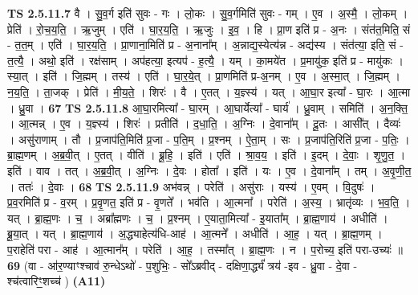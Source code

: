 \documentclass[17pt]{extarticle}
\begin{document}
                  \newline
                                \textbf{ TS 2.5.11.7} \newline
                  वै । सु॒व॒र्ग इति॑ सुवः - गः । लो॒कः । सु॒व॒र्गमिति॑ सुवः - गम् । ए॒व । अ॒स्मै॒ । लो॒कम् । प्रेति॑ । रो॒च॒य॒ति॒ । ऋ॒जुम् । एति॑ । घा॒र॒य॒ति॒ । ऋ॒जुः । इ॒व॒ । हि । प्रा॒ण इति॑ प्र - अ॒नः । संत॑त॒मिति॒ सं - त॒त॒म् । एति॑ । घा॒र॒य॒ति॒ । प्रा॒णाना॒मिति॑ प्र - अ॒नाना᳚म् । अ॒न्नाद्य॒स्येत्य॑न्न - अद्य॑स्य । संत॑त्या॒ इति॒ सं - त॒त्यै॒ । अथो॒ इति॑ । रक्ष॑साम् । अप॑हत्या॒ इत्यप॑ - ह॒त्यै॒ । यम् । का॒मये॑त । प्र॒मायु॑क॒ इति॑ प्र - मायु॑कः । स्या॒त् । इति॑ । जि॒ह्मम् । तस्य॑ । एति॑ । घा॒र॒ये॒त् । प्रा॒णमिति॑ प्र-अ॒नम् । ए॒व । अ॒स्मा॒त् । जि॒ह्मम् । न॒य॒ति॒ । ता॒जक् । प्रेति॑ । मी॒य॒ते॒ । शिरः॑ । वै । ए॒तत् । य॒ज्ञ्स्य॑ । यत् । आ॒घा॒र इत्या᳚ - घा॒रः । आ॒त्मा । ध्रु॒वा । \textbf{  67} \newline
                  \newline
                                \textbf{ TS 2.5.11.8} \newline
                  आ॒घा॒रमित्या᳚ - घा॒रम् । आ॒घार्येत्या᳚ - घार्य॑ । ध्रु॒वाम् । समिति॑ । अ॒न॒क्ति॒ । आ॒त्मन्न् । ए॒व । य॒ज्ञ्स्य॑ । शिरः॑ । प्रतीति॑ । द॒धा॒ति॒ । अ॒ग्निः । दे॒वाना᳚म् । दू॒तः । आसी᳚त् । दैव्यः॑ । असु॑राणाम् । तौ । प्र॒जाप॑ति॒मिति॑ प्र॒जा - प॒ति॒म् । प्र॒श्नम् । ऐ॒ता॒म् । सः । प्र॒जाप॑ति॒रिति॑ प्र॒जा - प॒तिः॒ । ब्रा॒ह्म॒णम् । अ॒ब्र॒वी॒त् । ए॒तत् । वीति॑ । ब्रू॒हि॒ । इति॑ । एति॑ । श्रा॒व॒य॒ । इति॑ । इ॒दम् । दे॒वाः॒ । शृ॒णु॒त॒ । इति॑ । वाव । तत् । अ॒ब्र॒वी॒त् । अ॒ग्निः । दे॒वः । होता᳚ । इति॑ । यः । ए॒व । दे॒वाना᳚म् । तम् । अ॒वृ॒णी॒त॒ । ततः॑ । दे॒वाः । \textbf{  68} \newline
                  \newline
                                \textbf{ TS 2.5.11.9} \newline
                  अभ॑वन्न् । परेति॑ । असु॑राः । यस्य॑ । ए॒वम् । वि॒दुषः॑ । प्र॒व॒रमिति॑ प्र - व॒रम् । प्र॒वृ॒णत॒ इति॑ प्र - वृ॒णते᳚ । भव॑ति । आ॒त्मना᳚ । परेति॑ । अ॒स्य॒ । भ्रातृ॑व्यः । भ॒व॒ति॒ । यत् । ब्रा॒ह्म॒णः । च॒ । अब्रा᳚ह्मणः । च॒ । प्र॒श्नम् । ए॒याता॒मित्या᳚ - इ॒याता᳚म् । ब्रा॒ह्म॒णाय॑ । अधीति॑ । ब्रू॒या॒त् । यत् । ब्रा॒ह्म॒णाय॑ । अ॒द्ध्याहेत्य॑धि-आह॑ । आ॒त्मने᳚ । अधीति॑ । आ॒ह॒ । यत् । ब्रा॒ह्म॒णम् । प॒राहेति॑ परा - आह॑ । आ॒त्मान᳚म् । परेति॑ । आ॒ह॒ । तस्मा᳚त् । ब्रा॒ह्म॒णः । न । प॒रोच्य॒ इति॑ परा-उच्यः॑ ॥ \textbf{  69} \newline
                  \newline
                      (वा - आ॑र॒ण्याꣳश्चाव॑ रु॒न्धेऽथो॑ - प॒शुभिः॒ - सो᳚ऽब्रवीद् - दक्षिणा॒र्द्ध्यं॑ त्रय॑ -इव - ध्रु॒वा - दे॒वा - श्च॑त्वारिꣳ॒॒शच्च॑ )  \textbf{(A11)} \newline \newline
\end{document}

